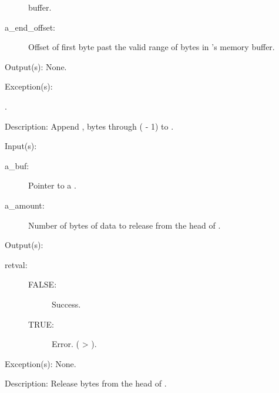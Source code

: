 \begin{capi}
\begin{capilist}
\begin{description}
			buffer.
		\item[a\_end\_offset: ]
			Offset of first byte past the valid range of bytes in
			's memory buffer.
		\end{description}
	\item[Output(s): ] None.
	\item[Exception(s): ]
		\begin{description}\item[]
		\item[.]
		\end{description}
	\item[Description: ]
		Append , bytes  through
		( - 1) to .
	\end{capilist}
\label{buf_head_data_release}
	\begin{capilist}
	\item[Input(s): ]
		\begin{description}\item[]
		\item[a\_buf: ]
			Pointer to a .
		\item[a\_amount: ]
			Number of bytes of data to release from the head of
			.
		\end{description}
	\item[Output(s): ]
		\begin{description}\item[]
		\item[retval: ]
			\begin{description}\item[]
			\item[FALSE: ]
				 Success.
			\item[TRUE: ]
				 Error.  ( >
				).
			\end{description}
		\end{description}
	\item[Exception(s): ] None.
	\item[Description: ]
		Release  bytes from the head of .
	\end{capilist}
\label{buf_tail_data_release}

\end{capi}
